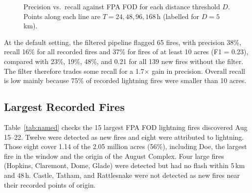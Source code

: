 \documentclass[10pt,journal,compsoc]{IEEEtran}
\begin{document}
\begin{figure}[!t]
\centering
{}
\caption{Precision vs.\ recall against FPA FOD for each distance threshold $D$. Points along each line are $T = 24, 48, 96, 168$\,h (labelled for $D = 5$\,km).}
\label{fig:pr}
\end{figure}

At the default setting, the filtered pipeline flagged 65 fires, with precision 38\%, recall 16\% for all recorded fires and 37\% for fires of at least 10 acres (F1 = 0.23), compared with 23\%, 19\%, 48\%, and 0.21 for all 139 new fires without the filter. The filter therefore trades some recall for a 1.7$\times$ gain in precision. Overall recall is low mainly because 75\% of recorded lightning fires were smaller than 10 acres.

\subsection{Largest Recorded Fires}
Table~\ref{tab:named} checks the 15 largest FPA FOD lightning fires discovered Aug 15--22. Twelve were detected as new fires and eight were attributed to lightning. Those eight cover 1.14 of the 2.05 million acres (56\%), including Doe, the largest fire in the window and the origin of the August Complex. Four large fires (Hopkins, Claremont, Dome, Glade) were detected but had no flash within 5\,km and 48\,h. Castle, Tatham, and Rattlesnake were not detected as new fires near their recorded points of origin.
\end{document}

